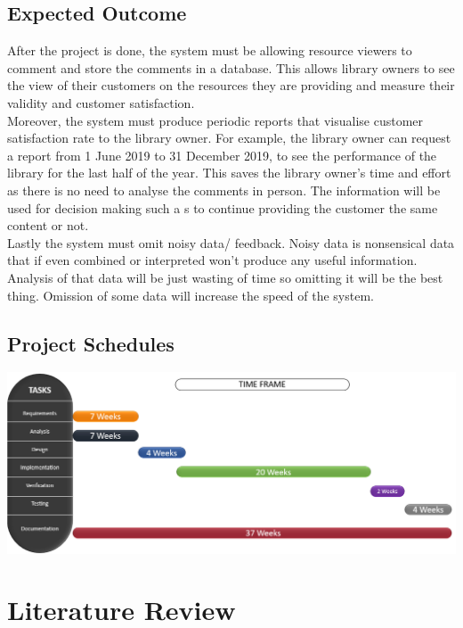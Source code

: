 \documentclass[12pt]{report}
\begin{document}
	\section{Expected Outcome}
	After the project is done, the system must be allowing resource viewers to comment and store the comments in a database. This allows library owners to see the view of their customers on the resources they are providing and measure their validity and customer satisfaction.\\
	Moreover, the system must produce periodic reports that visualise customer satisfaction rate to the library owner. For example, the library owner can request a report from 1 June 2019 to 31 December 2019, to see the performance of the library for the last half of the year. This saves the library owner’s time and effort as there is no need to analyse the comments in person. The information will be used for decision making such a s to continue providing the customer the same content or not.\\
	Lastly the system must omit noisy data/ feedback. Noisy data is nonsensical data that if even combined or interpreted won't produce any useful information. Analysis of that data will be just wasting of time so omitting it will be the best thing. Omission of some data will increase the speed of the system.
	
	\section{Project Schedules}
	
	\includegraphics[scale=0.5]{gant.png}
	
	\newpage
	\chapter{Literature Review}
\end{document}
